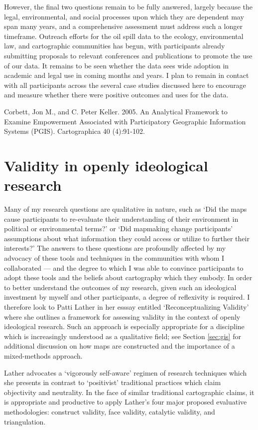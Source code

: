 \documentclass[11pt,oneside,notitlepage]{report}
\begin{document}
However, the final two questions remain to be fully answered, largely because the legal, environmental, and social processes upon which they are dependent may span many years, and a comprehensive assessment must address such a longer timeframe. Outreach efforts for the oil spill data to the ecology, environmental law, and cartographic communities has begun, with participants already submitting proposals to relevant conferences and publications to promote the use of our data. It remains to be seen whether the data sees wide adoption in academic and legal use in coming months and years. I plan to remain in contact with all participants across the several case studies discussed here to encourage and measure whether there were positive outcomes and uses for the data.  

Corbett, Jon M., and C. Peter Keller. 2005. An Analytical Framework to Examine Empowerment Associated with Participatory Geographic Information Systems (PGIS). Cartographica 40 (4):91-102.

\section{Validity in openly ideological research}
\label{sec:lather}

Many of my research questions are qualitative in nature, such as `Did the maps cause participants to re-evaluate their understanding of their environment in political or environmental terms?' or `Did mapmaking change participants' assumptions about what information they could access or utilize to further their interests?' The answers to these questions are profoundly affected by my advocacy of these tools and techniques in the communities with whom I collaborated --- and the degree to which I was able to convince participants to adopt these tools and the beliefs about cartography which they embody. In order to better understand the outcomes of my research, given such an ideological investment by myself and other participants, a degree of reflexivity is required. I therefore look to Patti Lather in her esssay entitled `Reconceptualizing Validity' where she outlines a framework for assessing validity in the context of openly ideological research. Such an approach is especially appropriate for a discipline which is increasingly understood as a qualitative field; see Section \ref{sec:gis} for additional discussion on how maps are constructed and the importance of a mixed-methods approach. 

Lather advocates a `vigorously self-aware' regimen of research techniques which she presents in contrast to `positivist' traditional practices which claim objectivity and neutrality. In the face of similar traditional cartographic claims, it is appropriate and productive to apply Lather's four major proposed evaluative methodologies: construct validity, face validity, catalytic validity, and triangulation. 
\end{document}
